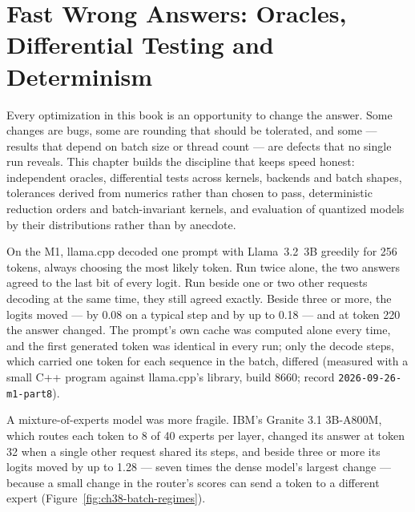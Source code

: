 \chapter{Fast Wrong Answers: Oracles, Differential Testing and Determinism}\label{ch:fast-wrong-answers}

\begin{ChapterIntent}
Every optimization in this book is an opportunity to change the answer.
Some changes are bugs, some are rounding that should be tolerated, and some ---
results that depend on batch size or thread count --- are defects that no
single run reveals. This chapter builds the discipline that keeps speed
honest: independent oracles, differential tests across kernels, backends and
batch shapes, tolerances derived from numerics rather than chosen to pass,
deterministic reduction orders and batch-invariant kernels, and evaluation of
quantized models by their distributions rather than by anecdote.
\end{ChapterIntent}


On the M1, llama.cpp decoded one prompt with Llama~3.2~3B greedily for 256
tokens, always choosing the most likely token. Run twice alone, the two answers
agreed to the last bit of every logit. Run beside one or two other requests
decoding at the same time, they still agreed exactly. Beside three or more,
the logits moved --- by 0.08 on a typical step and by up to 0.18 --- and at
token 220 the answer changed. The prompt's own cache was computed alone every
time, and the first generated token was identical in every run; only the
decode steps, which carried one token for each sequence in the batch, differed
(measured with a small C++ program against llama.cpp's library, build 8660; record
\texttt{2026-09-26-m1-part8}).

A mixture-of-experts model was more fragile. IBM's Granite 3.1 3B-A800M, which
routes each token to 8 of 40 experts per layer, changed its answer at token 32
when a single other request shared its steps, and beside three or more its
logits moved by up to 1.28 --- seven times the dense model's largest change ---
because a small change in the router's scores can send a token to a different
expert (Figure~\ref{fig:ch38-batch-regimes}).


